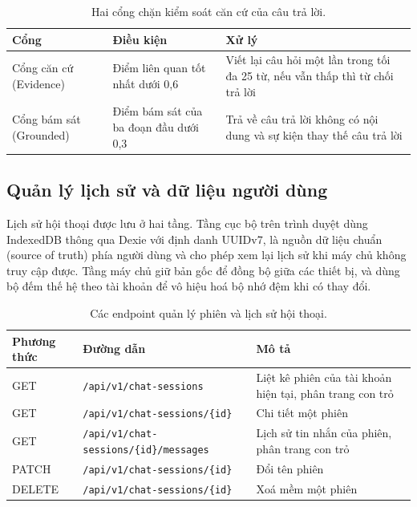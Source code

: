 \begin{table}[htbp]
    \centering
    \caption{Hai cổng chặn kiểm soát căn cứ của câu trả lời.}
    \label{tab:cong-chan}
    \small
    \begin{tabularx}{\textwidth}{@{}l>{\raggedright\arraybackslash}p{5.2cm}>{\raggedright\arraybackslash}X@{}}
        \toprule
        \textbf{Cổng} & \textbf{Điều kiện} & \textbf{Xử lý} \\
        \midrule
        Cổng căn cứ (Evidence) & Điểm liên quan tốt nhất dưới 0,6 & Viết lại câu hỏi một lần trong tối đa 25 từ, nếu vẫn thấp thì từ chối trả lời \\
        Cổng bám sát (Grounded) & Điểm bám sát của ba đoạn đầu dưới 0,3 & Trả về câu trả lời không có nội dung và sự kiện thay thế câu trả lời \\
        \bottomrule
    \end{tabularx}
\end{table}

\subsection{Quản lý lịch sử và dữ liệu người dùng}
\label{subsec:quan-ly-lich-su}

Lịch sử hội thoại được lưu ở hai tầng. Tầng cục bộ trên trình duyệt dùng IndexedDB thông qua Dexie với định danh UUIDv7, là nguồn dữ liệu chuẩn (source of truth) phía người dùng và cho phép xem lại lịch sử khi máy chủ không truy cập được. Tầng máy chủ giữ bản gốc để đồng bộ giữa các thiết bị, và dùng bộ đếm thế hệ theo tài khoản để vô hiệu hoá bộ nhớ đệm khi có thay đổi.

\begin{table}[htbp]
    \centering
    \caption{Các endpoint quản lý phiên và lịch sử hội thoại.}
    \label{tab:api-chat-sessions}
    \small
    \begin{tabularx}{\textwidth}{@{}l>{\raggedright\arraybackslash}p{7.4cm}>{\raggedright\arraybackslash}X@{}}
        \toprule
        \textbf{Phương thức} & \textbf{Đường dẫn} & \textbf{Mô tả} \\
        \midrule
        GET & \texttt{/api/v1/chat-sessions} & Liệt kê phiên của tài khoản hiện tại, phân trang con trỏ \\
        GET & \texttt{/api/v1/chat-sessions/\{id\}} & Chi tiết một phiên \\
        GET & \texttt{/api/v1/chat-sessions/\{id\}/messages} & Lịch sử tin nhắn của phiên, phân trang con trỏ \\
        PATCH & \texttt{/api/v1/chat-sessions/\{id\}} & Đổi tên phiên \\
        DELETE & \texttt{/api/v1/chat-sessions/\{id\}} & Xoá mềm một phiên \\
        \bottomrule
    \end{tabularx}
\end{table}

